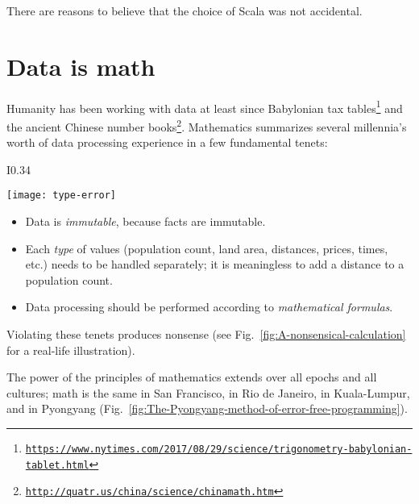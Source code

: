There are reasons to believe that the choice of Scala was not accidental.

\section{Data is math}

Humanity has been working with data at least since Babylonian tax
tables\footnote{\texttt{\href{https://www.nytimes.com/2017/08/29/science/trigonometry-babylonian-tablet.html}{https://www.nytimes.com/2017/08/29/science/trigonometry-babylonian-tablet.html}}}
and the ancient Chinese number books\footnote{\texttt{\href{http://quatr.us/china/science/chinamath.htm}{http://quatr.us/china/science/chinamath.htm}}}.
Mathematics summarizes several millennia's worth of data processing
experience in a few fundamental tenets:

\begin{wrapfigure}{I}{0.34\columnwidth}%
\begin{centering}
\vspace{-0.65\baselineskip}
\texttt{[image: type-error]}\vspace{-0.5\baselineskip}
\par\end{centering}
\caption{Mixing incompatible data types produces nonsensical results.\label{fig:A-nonsensical-calculation}}

\vspace{-3.5\baselineskip}
\end{wrapfigure}%

\begin{itemize}
\item Data is \emph{immutable}, because facts are immutable. 
\item Each \emph{type} of values (population count, land area, distances,
prices, times, etc.) needs to be handled separately; it is meaningless
to add a distance to a population count.
\item Data processing should be performed according to \emph{mathematical
formulas}. 
\end{itemize}
Violating these tenets produces nonsense (see Fig.\ \ref{fig:A-nonsensical-calculation}
for a real-life illustration).

The power of the principles of mathematics extends over all epochs
and all cultures; math is the same in San Francisco, in Rio de Janeiro,
in Kuala-Lumpur, and in Pyongyang (Fig.\ \ref{fig:The-Pyongyang-method-of-error-free-programming}).

